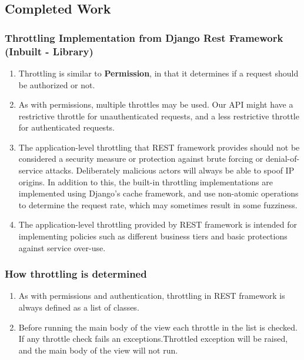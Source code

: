 \documentclass[12pt]{article}
\begin{document}
\subsection{Completed Work}
\subsubsection{Throttling Implementation from Django Rest Framework (Inbuilt - Library)}
\begin{enumerate}

    \item Throttling is similar to \textbf{Permission}, in that it determines if a request should be authorized or not.
    \item As with permissions, multiple throttles may be used. Our API might have a restrictive throttle for unauthenticated requests, and a less restrictive throttle for authenticated requests.
    \item The application-level throttling that REST framework provides should not be considered a security measure or protection against brute forcing or denial-of-service attacks. Deliberately malicious actors will always be able to spoof IP origins. In addition to this, the built-in throttling implementations are implemented using Django's cache framework, and use non-atomic operations to determine the request rate, which may sometimes result in some fuzziness.
    \item The application-level throttling provided by REST framework is intended for implementing policies such as different business tiers and basic protections against service over-use.
\end{enumerate}
\subsubsection{How throttling is determined}
\begin{enumerate}
    \item As with permissions and authentication, throttling in REST framework is always defined as a list of classes.
    \item Before running the main body of the view each throttle in the list is checked. If any throttle check fails an exceptions.Throttled exception will be raised, and the main body of the view will not run.
\end{enumerate}
\end{document}
